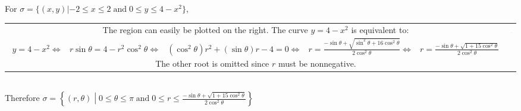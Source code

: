 \documentclass{article}
\newcommand{\dr}[1]{\textcolor{dark_red}{#1}}
\begin{document}
\dr{\begin{framed}
For \(\sigma = \{(x,y) | -2 \leq x \leq 2 \;\text{and}\; 0 \leq y \leq 4 - x^2\}\), \\
\begin{tabular}{cc}
\parbox{0.6\textwidth}{
The region can easily be plotted on the right. \\
The curve \(y = 4 - x^2\) is equivalent to:
\begin{align*}
y = 4 - x^2 \iff & r\sin\theta = 4 - r^2\cos^2\theta \\
\iff & (\cos^2\theta)r^2 + (\sin\theta)r - 4 = 0 \\
\iff & r = \frac{-\sin\theta + \sqrt{\sin^2\theta + 16\cos^2\theta}}{2\cos^2\theta} \\
\iff & r = \frac{-\sin\theta + \sqrt{1 + 15\cos^2\theta}}{2\cos^2\theta}
\end{align*}
The other root is omitted since \(r\) must be nonnegative.
} & \parbox{0.4\textwidth}{
\includegraphics[width = 0.4\textwidth]{Test_bench_part_3x_images/Test_bench_part_3x_Solutions_image_4}
}
\end{tabular} \\
Therefore \(\sigma = \left\{(r,\theta) \middle| 0 \leq \theta \leq \pi \;\text{and}\; 0 \leq r \leq \frac{-\sin\theta + \sqrt{1 + 15\cos^2\theta}}{2\cos^2\theta} \right\}\)
\end{framed}}

\pagebreak
\end{document}
